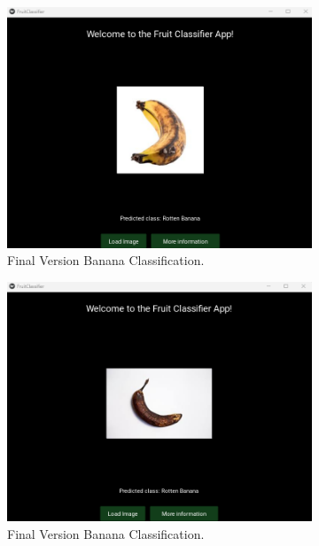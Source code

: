 \documentclass[conference]{IEEEtran}
\begin{document}
\begin{figure}[h]
\begin{subfigure}[b]{0.48\linewidth}
        \centering
        \includegraphics[width=\linewidth]{Mlayer bananaR2.png}
        \caption{Final Version Banana Classification.}
        \label{figFB}
    \end{subfigure}
    \hfill
    \begin{subfigure}[b]{0.48\linewidth}
        \centering
        \includegraphics[width=\linewidth]{Mlayer bananaR3.png}
        \caption{Final Version Banana Classification.}
        \label{figFB}
    \end{subfigure}
    \hfill
    \begin{subfigure}[b]{0.48\linewidth}
        \centering

\end{subfigure}
\end{figure}
\end{document}
